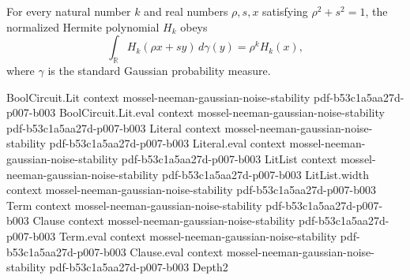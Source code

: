 \begin{lemma}
\label{BooleanAnalysis.GaussianSpace.integral_normalizedHermite_affine_standardGaussian}
\leanok
{}
For every natural number $k$ and real numbers $\rho,s,x$ satisfying $\rho^2+s^2=1$, the
normalized Hermite polynomial $H_k$ obeys
\[
\int_{\mathbb R} H_k(\rho x+sy)\,d\gamma(y)=\rho^k H_k(x),
\]
where $\gamma$ is the standard Gaussian probability measure.
\end{lemma}

\begin{theorem}
\label{BooleanAnalysis.GaussianSpace.gaussianNoise_hermiteFunction}
\leanok
{}
\proofstep
  {BoolCircuit.Lit}
  {context}
  {mossel-neeman-gaussian-noise-stability}
  {pdf-b53c1a5aa27d-p007-b003}
\proofstep
  {BoolCircuit.Lit.eval}
  {context}
  {mossel-neeman-gaussian-noise-stability}
  {pdf-b53c1a5aa27d-p007-b003}
\proofstep
  {Literal}
  {context}
  {mossel-neeman-gaussian-noise-stability}
  {pdf-b53c1a5aa27d-p007-b003}
\proofstep
  {Literal.eval}
  {context}
  {mossel-neeman-gaussian-noise-stability}
  {pdf-b53c1a5aa27d-p007-b003}
\proofstep
  {LitList}
  {context}
  {mossel-neeman-gaussian-noise-stability}
  {pdf-b53c1a5aa27d-p007-b003}
\proofstep
  {LitList.width}
  {context}
  {mossel-neeman-gaussian-noise-stability}
  {pdf-b53c1a5aa27d-p007-b003}
\proofstep
  {Term}
  {context}
  {mossel-neeman-gaussian-noise-stability}
  {pdf-b53c1a5aa27d-p007-b003}
\proofstep
  {Clause}
  {context}
  {mossel-neeman-gaussian-noise-stability}
  {pdf-b53c1a5aa27d-p007-b003}
\proofstep
  {Term.eval}
  {context}
  {mossel-neeman-gaussian-noise-stability}
  {pdf-b53c1a5aa27d-p007-b003}
\proofstep
  {Clause.eval}
  {context}
  {mossel-neeman-gaussian-noise-stability}
  {pdf-b53c1a5aa27d-p007-b003}
\proofstep
  {Depth2}

\end{theorem}
